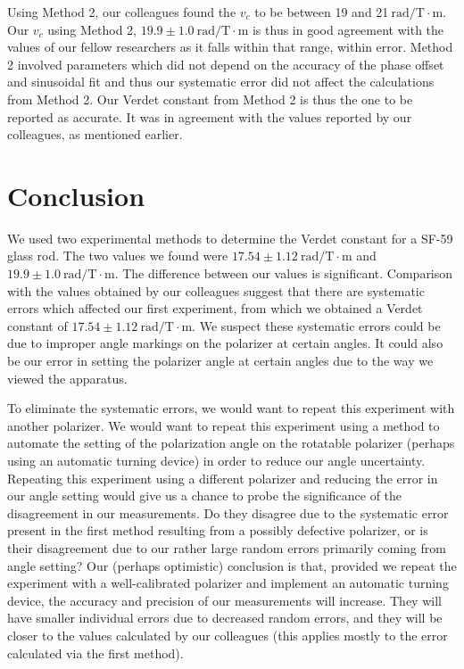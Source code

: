 \documentclass[prb,preprint]{revtex4-1}
\begin{document}
{{Using Method 2, our colleagues found the $v_c$ to be between 19 and 21$\mathrm{~rad/T} \cdot \textrm{m}$.  Our $v_c$ using Method 2, $19.9 \pm 1.0 \mathrm{~rad/T} \cdot \textrm{m}$ is thus in good agreement with the values of our fellow researchers as it falls within that range, within error. 
Method 2 involved parameters which did not depend on the accuracy of the phase offset and sinusoidal fit and thus our systematic error did not affect the calculations from Method 2.  Our Verdet constant from Method 2 is thus the one to be reported as accurate.  
It was in agreement with the values reported by our colleagues, as mentioned earlier.}

\section{Conclusion}
We used two experimental methods to determine the Verdet constant for a SF-59 glass rod. The two values we found were $17.54 \pm 1.12 \mathrm{~rad/T} \cdot \textrm{m}$ and $19.9 \pm 1.0 \mathrm{~rad/T} \cdot \textrm{m}$. The difference between our values is significant. Comparison with the values obtained by our colleagues suggest that there are systematic errors which affected our first experiment, from which we obtained a Verdet constant of $17.54 \pm 1.12 \mathrm{~rad/T} \cdot \textrm{m}$. We suspect these systematic errors could be due to improper angle markings on the polarizer at certain angles. It could also be our error in setting the polarizer angle at certain angles due to the way we viewed the apparatus.


To eliminate the systematic errors, we would want to repeat this experiment with another polarizer. We would want to repeat this experiment using a method to automate the setting of the polarization angle on the rotatable polarizer (perhaps using an automatic turning device) in order to reduce our angle uncertainty. 
Repeating this experiment using a different polarizer and reducing the error in our angle setting would give us a chance to probe the significance of the disagreement in our measurements.  
Do they disagree due to the systematic error present in the first method resulting from a possibly defective polarizer, or is their disagreement due to our rather large random errors primarily coming from angle setting? 
Our (perhaps optimistic) conclusion is that, provided we repeat the experiment with a well-calibrated polarizer and implement an automatic turning device, the accuracy and precision of our measurements will increase.  
They will have smaller individual errors due to decreased random errors, and they will be closer to the values calculated by our colleagues (this applies mostly to the error calculated via the first method).

}
\end{document}
